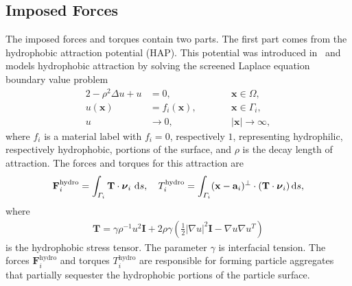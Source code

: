 \documentclass[lineno]{jfm}
\renewcommand{\aa}{\mathbf{a}}
\newcommand{\FF}{\mathbf{F}}
\newcommand{\nnu}{\boldsymbol{\nu}}
\newcommand{\xx}{\mathbf{x}}
\begin{document}
\subsection{Imposed Forces}
The imposed forces and torques contain two parts. The first part comes
from the hydrophobic attraction potential (HAP). This potential was
introduced in~\cite{Fu20} and models hydrophobic attraction by solving
the screened Laplace equation boundary value problem
\begin{alignat}{2}
  \label{eq:SL}
-\rho^2 \Delta u + u &=0,            && \xx \in \Omega,\\
\label{eq:SLbc}
u(\xx) &= f_i(\xx),\qquad  && \xx \in \Gamma_i, \\
\label{eq:SLff}
u &\to 0,                          &&|\xx| \to \infty,
\end{alignat}
where $f_i$ is a material label with $f_i = 0$, respectively $1$, representing
hydrophilic, respectively hydrophobic, portions of the surface, and $\rho$ is the
decay length of attraction. The forces and torques for this attraction
are 
\begin{align}
  \label{eq:hydrophobicAttraction}
  \FF_i^{\text{hydro}} = \int_{\Gamma_i} {\bf T}\cdot \nnu_i \, \dif s, 
    \quad 
  T_i^{\text{hydro}} = \int_{\Gamma_i} (\xx - \aa_i)^{\perp} \cdot ({\bf T} \cdot \nnu_i) \dif s,
\end{align}
where
\begin{align}
  \label{eq:stress}
\mathbf{T}
= \gamma\rho^{-1}u^2 \mathbf{I} + 2\rho\gamma \left(\tfrac{1}{2}|\nabla
  u|^2 \mathbf{I} - \nabla u  \nabla u^T\right)
\end{align}
is the hydrophobic stress tensor. The parameter $\gamma$ is interfacial
tension. The forces $\FF_i^{\text{hydro}}$ and torques
$T_i^{\text{hydro}}$ are responsible for forming particle aggregates
that partially sequester the hydrophobic portions of the particle
surface.
\end{document}
